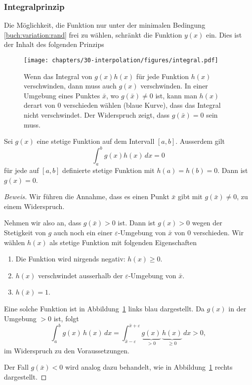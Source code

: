 \subsubsection{Integralprinzip}
%
Die Möglichkeit, die Funktion nur unter der minimalen Bedingung
\eqref{buch:variation:rand} frei zu wählen, schränkt die Funktion
$y(x)$ ein.
Dies ist der Inhalt des folgenden Prinzips
\begin{figure}
\centering
\texttt{[image: chapters/30-interpolation/figures/integral.pdf]}
\caption{Wenn das Integral von $g(x) h(x)$ für jede Funktion $h(x)$
verschwinden, dann muss auch $g(x)$ verschwinden.
In einer Umgebung eines Punktes $\bar{x}$, wo $g(\bar{x})\ne 0$ ist,
kann man $h(x)$ derart von $0$ verschieden wählen (blaue Kurve),
dass das Integral nicht verschwindet.
Der Widerspruch zeigt, dass $g(\bar{x})=0$ sein muss.
\label{buch:interpolation:figure:integralprinzip}}
\end{figure}

\begin{lemma}[Integralprinzip]
\label{buch:lemma:integralprinzip}
Sei $g(x)$ eine stetige Funktion auf dem Intervall $[a,b]$.
Ausserdem gilt
\[
\int_a^b g(x)  h(x)\,dx = 0
\]
für jede auf $[a,b]$ definierte stetige Funktion mit $h(a)=h(b)=0$.
Dann ist $g(x)=0$.
\end{lemma}

\begin{proof}[Beweis]
Wir führen die Annahme, dass es einen Punkt $\bar{x}$ gibt mit
$g(\bar{x})\ne 0$, zu einem Widerspruch.
%

Nehmen wir also an, dass $g(\bar{x})>0$ ist.
Dann ist $g(x)>0$ wegen der Stetigkeit von $g$ auch noch ein einer
$\varepsilon$-Umgebung von $\bar{x}$ von $0$ verschieden.
Wir wählen $h(x)$ als stetige Funktion mit folgenden Eigenschaften
\begin{enumerate}
\item
Die Funktion wird nirgends negativ: $h(x)\ge 0$.
\item
$h(x)$ verschwindet ausserhalb der $\varepsilon$-Umgebung von $\bar{x}$.
\item
$h(\bar{x})=1$.
\end{enumerate}
Eine solche Funktion ist in
Abbildung~\ref{buch:interpolation:figure:integralprinzip} links
blau dargestellt.
Da $g(x)$ in der Umgebung $>0$ ist, folgt
\[
\int_a^b g(x)\,h(x)\,dx
=
\int_{\bar{x}-\varepsilon}^{\bar{x}+\varepsilon}
\underbrace{g(x)}_{\displaystyle>0}\,\underbrace{h(x)}_{\displaystyle\ge 0}\,dx
>
0,
\]
im Widerspruch zu den Voraussetzungen.

Der Fall $g(\bar{x})<0$ wird analog dazu behandelt, wie in
Abbildung~\ref{buch:interpolation:figure:integralprinzip} rechts
dargestellt.
\end{proof}

